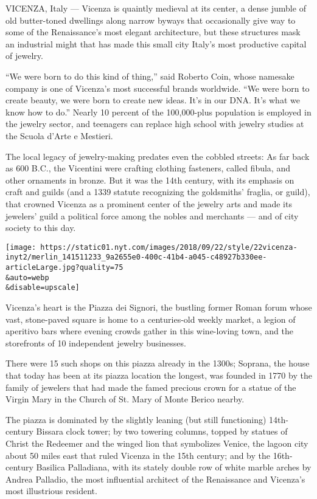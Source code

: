 VICENZA, Italy --- Vicenza is quaintly medieval at its center, a dense
jumble of old butter-toned dwellings along narrow byways that
occasionally give way to some of the Renaissance's most elegant
architecture, but these structures mask an industrial might that has
made this small city Italy's most productive capital of jewelry.

``We were born to do this kind of thing,'' said Roberto Coin, whose
namesake company is one of Vicenza's most successful brands worldwide.
``We were born to create beauty, we were born to create new ideas. It's
in our DNA. It's what we know how to do.'' Nearly 10 percent of the
100,000-plus population is employed in the jewelry sector, and teenagers
can replace high school with jewelry studies at the Scuola d'Arte e
Mestieri.

The local legacy of jewelry-making predates even the cobbled streets: As
far back as 600 B.C., the Vicentini were crafting clothing fasteners,
called fibula, and other ornaments in bronze. But it was the 14th
century, with its emphasis on craft and guilds (and a 1339 statute
recognizing the goldsmiths' fraglia, or guild), that crowned Vicenza as
a prominent center of the jewelry arts and made its jewelers' guild a
political force among the nobles and merchants --- and of city society
to this day.

\texttt{[image: https://static01.nyt.com/images/2018/09/22/style/22vicenza-inyt2/merlin\_141511233\_9a2655e0-400c-41b4-a045-c48927b330ee-articleLarge.jpg?quality=75\\\&auto=webp\\\&disable=upscale]}

Vicenza's heart is the Piazza dei Signori, the bustling former Roman
forum whose vast, stone-paved square is home to a centuries-old weekly
market, a legion of aperitivo bars where evening crowds gather in this
wine-loving town, and the storefronts of 10 independent jewelry
businesses.

There were 15 such shops on this piazza already in the 1300s; Soprana,
the house that today has been at its piazza location the longest, was
founded in 1770 by the family of jewelers that had made the famed
precious crown for a statue of the Virgin Mary in the Church of St. Mary
of Monte Berico nearby.

The piazza is dominated by the slightly leaning (but still functioning)
14th-century Bissara clock tower; by two towering columns, topped by
statues of Christ the Redeemer and the winged lion that symbolizes
Venice, the lagoon city about 50 miles east that ruled Vicenza in the
15th century; and by the 16th-century Basilica Palladiana, with its
stately double row of white marble arches by Andrea Palladio, the most
influential architect of the Renaissance and Vicenza's most illustrious
resident.

